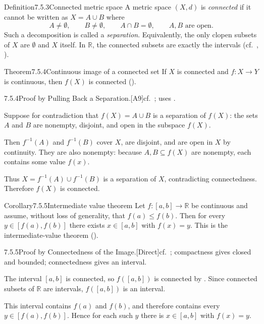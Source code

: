 \documentclass[main.tex]{subfiles}
\begin{document}
\begin{Obj}{Definition}{7.5.3}{Connected metric space}
A metric space $(X,d)$ is \emph{connected} if it cannot be written as
$X=A\cup B$ where
\[
  A\ne\emptyset,\qquad B\ne\emptyset,\qquad A\cap B=\emptyset,\qquad A,B\text{ are open}.
\]
Such a decomposition is called a \emph{separation}. Equivalently, the only clopen subsets of
$X$ are $\emptyset$ and $X$ itself. In $\mathbb R$, the connected subsets are exactly the
intervals (cf.\ , ).
\end{Obj}

\begin{Obj}{Theorem}{7.5.4}{Continuous image of a connected set}
If $X$ is connected and $f:X\to Y$ is continuous, then $f(X)$ is connected ().
\end{Obj}
\begin{Prf}{7.5.4}{Proof by Pulling Back a Separation.}{[A9]\quad cf.\ ; uses .}
\item Suppose for contradiction that $f(X)=A\cup B$ is a separation of $f(X)$: the sets
  $A$ and $B$ are nonempty, disjoint, and open in the subspace $f(X)$.
\item Then $f^{-1}(A)$ and $f^{-1}(B)$ cover $X$, are disjoint, and are open in $X$ by continuity.
  They are also nonempty: because $A,B\subseteq f(X)$ are nonempty, each contains some value
  $f(x)$.
\item Thus $X=f^{-1}(A)\cup f^{-1}(B)$ is a separation of $X$, contradicting connectedness.
  Therefore $f(X)$ is connected.
\end{Prf}

\begin{Obj}{Corollary}{7.5.5}{Intermediate value theorem}
Let $f:[a,b]\to\mathbb R$ be continuous and assume, without loss of generality, that
$f(a)\le f(b)$. Then for every $y\in[f(a),f(b)]$ there exists $x\in[a,b]$ with $f(x)=y$.
This is the intermediate-value theorem ().
\end{Obj}
\begin{Prf}{7.5.5}{Proof by Connectedness of the Image.}{[Direct]\quad cf.\ ; compactness gives closed and bounded; connectedness gives an interval.}
\item The interval $[a,b]$ is connected, so $f([a,b])$ is connected by . Since connected
  subsets of $\mathbb R$ are intervals, $f([a,b])$ is an interval.
\item This interval contains $f(a)$ and $f(b)$, and therefore contains every
  $y\in[f(a),f(b)]$. Hence for each such $y$ there is $x\in[a,b]$ with $f(x)=y$.
\end{Prf}
\end{document}

